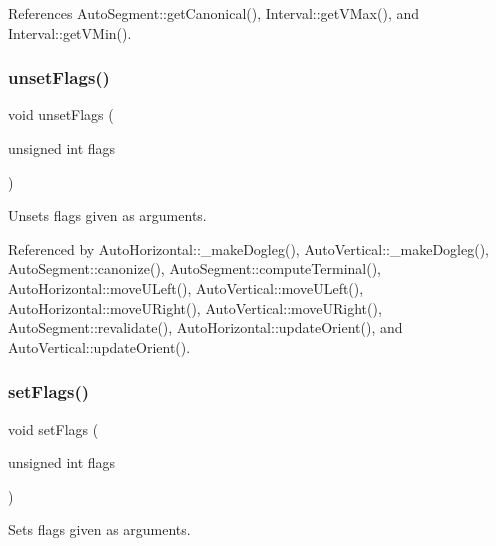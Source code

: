 References Auto\+Segment\+::get\+Canonical(), Interval\+::get\+V\+Max(), and Interval\+::get\+V\+Min().

\mbox{\label{classKatabatic_1_1AutoSegment_a1a6fac115cb81db48e3ac9ffa0721bb5}} 
\subsubsection{\texorpdfstring{unset\+Flags()}{unsetFlags()}}
{\footnotesize\ttfamily void unset\+Flags (\begin{DoxyParamCaption}\item[{unsigned int}]{flags }\end{DoxyParamCaption})\hspace{0.3cm}{\ttfamily [inline]}}

Unsets {\ttfamily flags} given as arguments. 

Referenced by Auto\+Horizontal\+::\+\_\+make\+Dogleg(), Auto\+Vertical\+::\+\_\+make\+Dogleg(), Auto\+Segment\+::canonize(), Auto\+Segment\+::compute\+Terminal(), Auto\+Horizontal\+::move\+U\+Left(), Auto\+Vertical\+::move\+U\+Left(), Auto\+Horizontal\+::move\+U\+Right(), Auto\+Vertical\+::move\+U\+Right(), Auto\+Segment\+::revalidate(), Auto\+Horizontal\+::update\+Orient(), and Auto\+Vertical\+::update\+Orient().

\mbox{\label{classKatabatic_1_1AutoSegment_aeb14f94914af58657a0dc2f50ec98df5}} 
\subsubsection{\texorpdfstring{set\+Flags()}{setFlags()}}
{\footnotesize\ttfamily void set\+Flags (\begin{DoxyParamCaption}\item[{unsigned int}]{flags }\end{DoxyParamCaption})\hspace{0.3cm}{\ttfamily [inline]}}

Sets {\ttfamily flags} given as arguments. 

